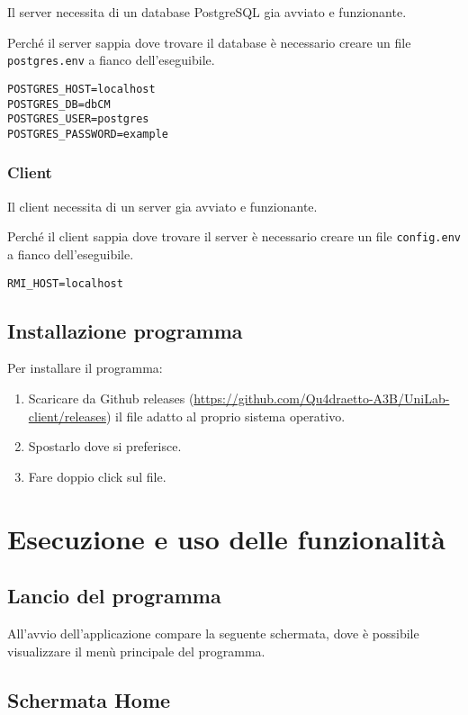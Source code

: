 Il server necessita di un database PostgreSQL gia avviato e funzionante.

Perché il server sappia dove trovare il database è necessario creare un file \texttt{postgres.env} a fianco dell'eseguibile.

\begin{lstlisting}[caption={Esempio \texttt{postgres.env}}]
POSTGRES_HOST=localhost
POSTGRES_DB=dbCM
POSTGRES_USER=postgres
POSTGRES_PASSWORD=example
\end{lstlisting}

\subsection{Client}

Il client necessita di un server gia avviato e funzionante.

Perché il client sappia dove trovare il server è necessario creare un file \texttt{config.env} a fianco dell'eseguibile.

\begin{lstlisting}[caption={Esempio \texttt{postgres.env}}]
RMI_HOST=localhost
\end{lstlisting}

\section{Installazione programma}

Per installare il programma:

\begin{enumerate}
	\item Scaricare da Github releases (\url{https://github.com/Qu4draetto-A3B/UniLab-client/releases}) il file adatto al proprio sistema operativo.
	\item Spostarlo dove si preferisce.
	\item Fare doppio click sul file.
\end{enumerate}

\chapter{Esecuzione e uso delle funzionalità}
\section{Lancio del programma}
All’avvio dell’applicazione compare la seguente schermata, dove è possibile visualizzare il menù principale del programma.
\section{Schermata Home}

